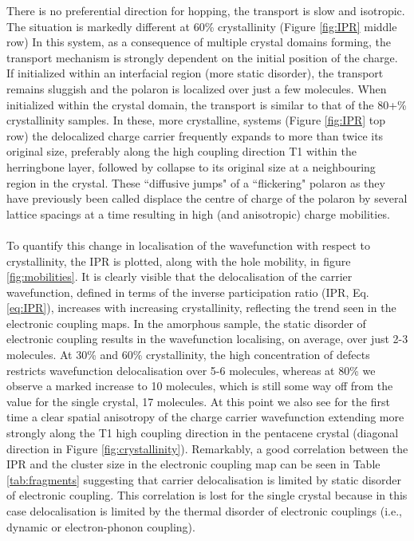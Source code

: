 There is no preferential direction for hopping, the transport is slow and isotropic. The situation is markedly different at 60\% crystallinity (Figure \ref{fig:IPR} middle row)
In this system, as a consequence of multiple crystal domains forming, the transport mechanism is strongly dependent on the initial position of the charge. If initialized within an interfacial region (more static disorder), the transport remains sluggish and the polaron is localized over just a few molecules. When initialized within the crystal domain, the transport is similar to that of the 80+\% crystallinity samples. In these, more crystalline, systems (Figure \ref{fig:IPR} top row)
the delocalized charge carrier frequently expands to more than twice its original size, preferably along the high coupling direction T1 within the herringbone layer, followed by collapse to its
original size at a neighbouring region in the crystal.  These ``diffusive jumps" of a ``flickering" polaron as they have previously been called \cite{FlickPolarons, Giannini2019}
displace the centre of charge of the polaron by several lattice spacings at a time resulting in high (and anisotropic) charge mobilities.
\\\\
To quantify this change in localisation of the wavefunction with respect to crystallinity, the IPR is plotted, along with the hole mobility, in figure \ref{fig:mobilities}. It is clearly visible that the delocalisation of the carrier wavefunction, defined in terms of the inverse participation ratio (IPR, Eq. \eqref{eq:IPR}), increases with increasing crystallinity, reflecting the trend seen in the electronic coupling maps. In the amorphous sample, the static disorder of electronic coupling results in the wavefunction localising, on average, over just 2-3 molecules. At 30\% and 60\% crystallinity, the high concentration of defects restricts wavefunction delocalisation over 5-6 molecules, whereas at 80\% we observe a marked increase to 10 molecules, which is still some way off from the value for the single crystal, 17 molecules.  At this point we also see for the first time a clear spatial anisotropy of the charge carrier wavefunction extending more strongly along the T1 high coupling direction in the pentacene crystal (diagonal direction in Figure \ref{fig:crystallinity}). Remarkably, a good correlation between the IPR and the cluster size in the electronic coupling map can be seen in Table \ref{tab:fragments} suggesting that carrier delocalisation is limited by static disorder of electronic coupling. This correlation is lost for the single crystal because in this case delocalisation is limited by the thermal disorder of electronic couplings (i.e., dynamic or electron-phonon coupling). 

